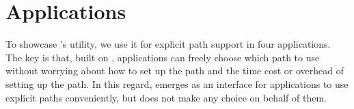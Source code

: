 \section{\sys Applications}\label{sec:application}
To showcase \sys's utility, we use it for explicit path support in four applications. The key is that, built on \sys, applications can freely choose which path to use without worrying about how to set up the path and the time cost or overhead of setting up the path. In this regard, \sys emerges as an interface for applications to use explicit paths conveniently, but does not make any choice on behalf of them.


%


